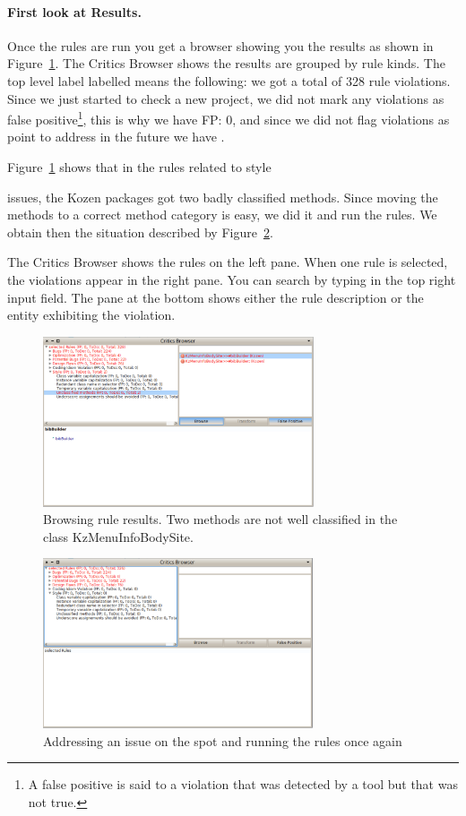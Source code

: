 \documentclass[a4paper,10pt,twoside]{book}
\begin{document}
\paragraph{First look at Results.} Once the rules are run you get a browser showing you the results as shown in Figure~\ref{unclassified}. 
The Critics Browser shows the results are grouped by rule kinds. 
The top level label labelled  means the following: we got a total of 328 rule violations. Since we just started to check a new project, we did not mark any violations as false positive\footnote{A false positive is said to a violation that was detected by a tool but that was not true.}, this is why we have FP: 0, and since we did not flag violations as point to address in the future we have .


Figure~\ref{unclassified} shows that in the rules related to style

 issues, the Kozen packages got two badly classified methods. Since moving the methods to a correct method category is easy, we did it and run the rules. We obtain then the situation described by Figure~\ref{reapplying}.

The Critics Browser shows the rules on the left pane. When one rule is selected, the violations appear in the right pane. You can search by typing in the top right input field. The pane at the bottom shows either the rule description or the entity exhibiting the violation. 

\begin{figure}[h]
\centering
\includegraphics[width=8cm]{UnclassifiedMethods}
\caption{Browsing rule results. Two methods are not well classified in the class KzMenuInfoBodySite.\label{unclassified}}
\end{figure}


\begin{figure}[h]
\centering
\includegraphics[width=8cm]{ReapplyingTheRulesAfterAChange}
\caption{Addressing an issue on the spot and running the rules once again\label{reapplying}}
\end{figure}
\end{document}
